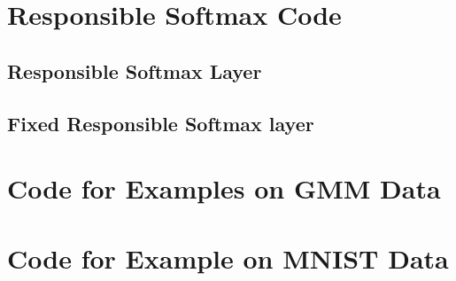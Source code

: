 

\newpage


\chapter{Responsible Softmax Code}\label{app:RScode}
\section{Responsible Softmax Layer}\label{code:RSlayer}







\section{Fixed Responsible Softmax layer}\label{code:fixedRSLayer}



\chapter{Code for Examples on GMM Data}\label{app:GMMexample}






\chapter{Code for Example on MNIST Data}\label{app:MNISTexample}




\begin{verbatim}


\end{verbatim}